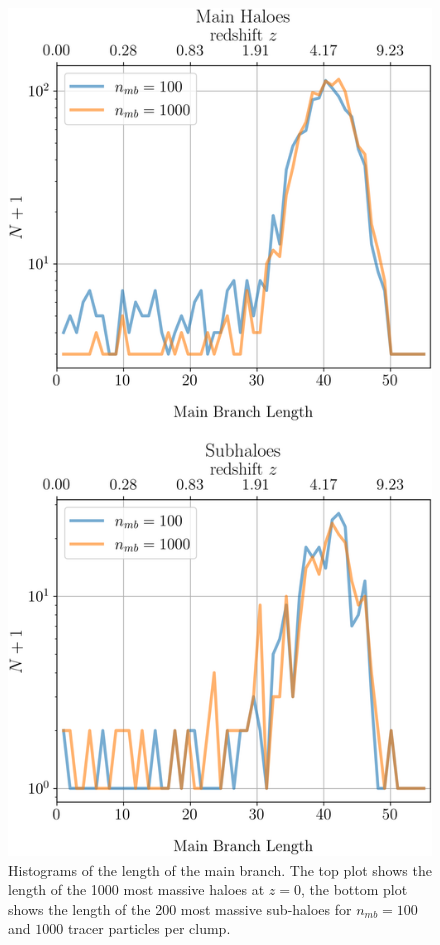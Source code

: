 \begin{figure}
	\centering
	\includegraphics[width=.7\linewidth,
	keepaspectratio]
	{figures/ACACIA/tree-statistics-sussing-threshold/main-branch-lenghts-all-bins-ntrace.png}%
	\caption{
		Histograms of the length of the main branch.
		The top plot shows the length of the 1000 most massive haloes at $z = 0$, the bottom plot shows
		the length of the 200 most massive sub-haloes for $n_{mb} = 100$ and $1000$ tracer particles
		per clump.
	}%
	\label{fig:sussing-branch-lengths}
\end{figure}


